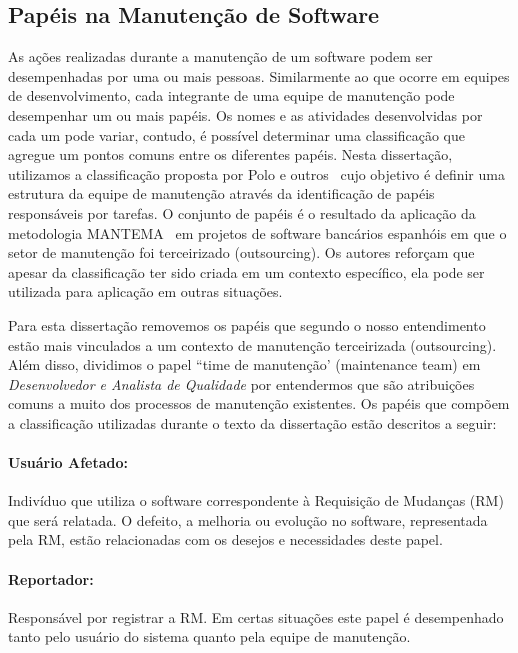 \subsection{Papéis na Manutenção de Software}
\label{subsec:man_visao_geral_papeis_na_manutencao_de_software}

As ações realizadas durante a manutenção de um software podem ser desempenhadas
por uma ou mais pessoas. Similarmente ao que ocorre em equipes de
desenvolvimento, cada integrante de uma equipe de manutenção pode desempenhar um
ou mais papéis. Os nomes e as atividades desenvolvidas por cada um pode variar,
contudo, é possível determinar uma classificação que agregue um pontos comuns
entre os diferentes papéis. Nesta dissertação, utilizamos a classificação
proposta por Polo e outros~\cite{Polo1999} cujo objetivo é definir uma estrutura
da equipe de manutenção através da identificação de papéis responsáveis por
tarefas. O conjunto de papéis é o resultado da aplicação da metodologia
MANTEMA~\cite{756695} em projetos de software bancários espanhóis em que o setor
de manutenção foi terceirizado (outsourcing). Os autores reforçam que apesar da
classificação ter sido criada em um contexto específico, ela pode ser utilizada
para aplicação em outras situações.

Para esta dissertação removemos os papéis que segundo o nosso entendimento estão
mais vinculados a um contexto de manutenção terceirizada (outsourcing).  Além
disso, dividimos o papel ``time de manutenção' (maintenance team) em
\textit{Desenvolvedor e Analista de Qualidade} por entendermos que são
atribuições comuns a muito dos processos de manutenção existentes. Os papéis que
compõem a classificação utilizadas durante o texto da dissertação estão
descritos a seguir:

\paragraph{Usuário Afetado:}
Indivíduo que utiliza o software correspondente à Requisição de Mudanças (RM)
que será relatada. O defeito, a melhoria ou evolução no software, representada
pela RM, estão relacionadas com os desejos e necessidades deste papel.

\paragraph{Reportador:}
Responsável por registrar a RM\@. Em certas situações este papel é desempenhado
tanto pelo usuário do sistema quanto pela equipe de manutenção.

